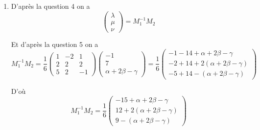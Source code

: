 \documentclass[a4paper, 11pt,reqno]{article}
\begin{document}
\begin{correction}
\begin{enumerate}
\item D'après la question 4 on a 
$$\begin{pmatrix}
\lambda\\
\mu\\
\nu
\end{pmatrix} =M_1^{-1} M_2  $$


Et d'après la question 5 on  a 
$$M_1^{-1}M_2 =\frac{1}{6} \begin{pmatrix}
1 & -2 & 1\\
2 & 2 & 2\\
5 & 2 &-1
\end{pmatrix}   \begin{pmatrix}
-1\\
7\\
 \alpha + 2\beta - \gamma 
\end{pmatrix}   = \frac{1}{6}   \begin{pmatrix}
-1 -14+ \alpha + 2\beta - \gamma \\
-2 +14 +2( \alpha + 2\beta - \gamma )\\
-5+14 -( \alpha + 2\beta - \gamma) 
\end{pmatrix} $$

D'où $$M_1^{-1}M_2 = \frac{1}{6}   \begin{pmatrix}
-15+ \alpha + 2\beta - \gamma \\
12 +2( \alpha + 2\beta - \gamma )\\
9 -( \alpha + 2\beta - \gamma) 
\end{pmatrix} $$


\end{enumerate}
\end{correction}
\end{document}

